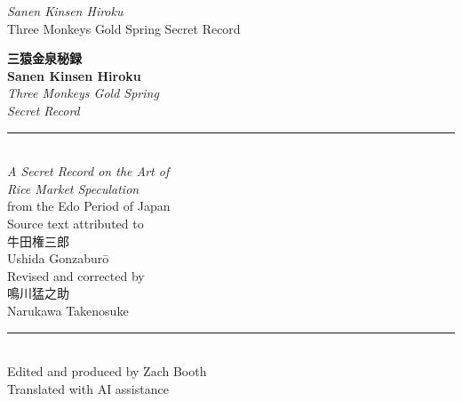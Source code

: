 \documentclass[10pt, openany]{book}
\newcommand{\jp}[1]{{\japanesefont #1}}
\begin{document}
\thispagestyle{empty}
\begin{center}
\vspace*{2.5in}
{\Large\itshape Sanen Kinsen Hiroku}\\[0.5em]
{\large Three Monkeys Gold Spring Secret Record}
\vfill
\end{center}
\newpage\thispagestyle{empty}\mbox{}\newpage

\thispagestyle{empty}
\begin{center}
\vspace*{1in}
{\huge\bfseries\color{chaptercolor} \jp{三猿金泉秘録}}\\[1em]
{\LARGE\bfseries Sanen Kinsen Hiroku}\\[0.7em]
{\Large\itshape Three Monkeys Gold Spring\\Secret Record}\\[2em]
\rule{3in}{0.5pt}\\[1.5em]
{\large\itshape A Secret Record on the Art of\\Rice Market Speculation}\\[0.5em]
{\normalsize from the Edo Period of Japan}\\[2.5em]
{\normalsize Source text attributed to}\\[0.3em]
{\large \jp{牛田権三郎}}\\
{\normalsize Ushida Gonzabur\=o}\\[1.5em]
{\normalsize Revised and corrected by}\\[0.3em]
{\large \jp{鳴川猛之助}}\\
{\normalsize Narukawa Takenosuke}\\[2em]
\rule{3in}{0.5pt}\\[1.5em]
{\normalsize Edited and produced by Zach Booth}\\[0.3em]
{\small Translated with AI assistance}\\[3em]
\end{center}
\vfill
\newpage

\thispagestyle{empty}
~\vfill
\end{document}

